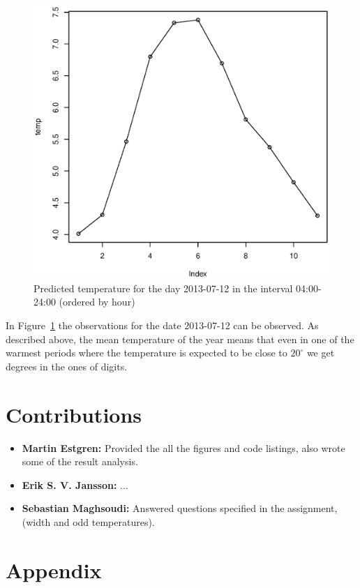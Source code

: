 \documentclass[a4paper, twocolumn]{article}
\begin{document}
    \begin{figure}[H]
    \centering
    \caption{Predicted temperature for the day 2013-07-12 in the interval 04:00-24:00 (ordered by hour)\label{fig:bad_result}}
	    \begin{minipage}[]{0.4\textwidth}
	    	\includegraphics[width=\textwidth]{share/bad_result.eps}
	    \end{minipage}
    \end{figure}
	In Figure~\ref{fig:bad_result} the observations for the date 2013-07-12 can be observed. As described above, the mean temperature of the year means that even in one of the warmest periods where the temperature is expected to be close to \(20^\circ \) we get degrees in the ones of digits.

    \section*{Contributions}

    \begin{itemize}
    	\item{\textbf{Martin Estgren:} Provided the all the figures and code listings, also wrote some of the result analysis.}
    	\item{\textbf{Erik S. V. Jansson:} ...}
    	\item{\textbf{Sebastian Maghsoudi:} Answered questions specified in the assignment,(width and odd temperatures).}
    \end{itemize}

    \nocite{*} %
    
    
    \onecolumn \appendix
    \section*{Appendix}
 	


    
\end{document}
